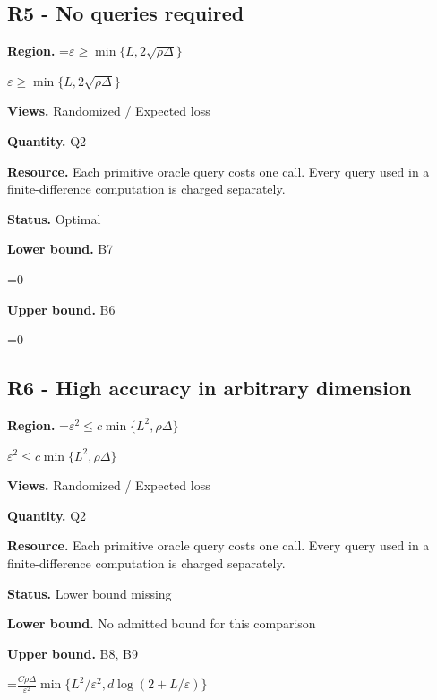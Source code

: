 \documentclass[10pt,a4paper]{article}
\newcommand{\AtlasMath}[1]{\par\begingroup\centering\setbox0=\hbox{$\displaystyle #1$}\ifdim\wd0>1.4\linewidth\typeout{ATLAS WIDE FORMULA: \the\wd0}\fi\ifdim\wd0>\linewidth\resizebox{\linewidth}{!}{\box0}\else\box0\fi\par\endgroup}
\newcommand{\AtlasInlineMath}[1]{\begingroup\setbox0=\hbox{$#1$}\ifdim\wd0>.4\linewidth\endgroup\AtlasMath{#1}\else\endgroup$#1$\fi}
\begin{document}
\subsection{R5 - No queries required}


\textbf{Region.} \AtlasInlineMath{\varepsilon\ge\min\{L,2\sqrt{\rho\Delta}\}}



\textbf{Views.} Randomized / Expected loss



\textbf{Quantity.} Q2



\textbf{Resource.} Each primitive oracle query costs one call. Every query used in a finite-difference computation is charged separately.



\textbf{Status.} Optimal



\textbf{Lower bound.} B7



\AtlasMath{0}


\textbf{Upper bound.} B6



\AtlasMath{0}


\subsection{R6 - High accuracy in arbitrary dimension}


\textbf{Region.} \AtlasInlineMath{\varepsilon^2\le c\min\{L^2,\rho\Delta\}}



\textbf{Views.} Randomized / Expected loss



\textbf{Quantity.} Q2



\textbf{Resource.} Each primitive oracle query costs one call. Every query used in a finite-difference computation is charged separately.



\textbf{Status.} Lower bound missing



\textbf{Lower bound.} No admitted bound for this comparison



\textbf{Upper bound.} B8, B9



\AtlasMath{\frac{C\rho\Delta}{\varepsilon^2}\min\{L^2/\varepsilon^2,d\log(2+L/\varepsilon)\}}
\end{document}
